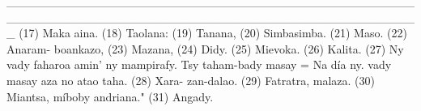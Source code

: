 _________________________________________________________________________________________________
(17) Maka aina. (18) Taolana: (19) Tanana, (20) Simbasimba. (21) Maso. (22) Anaram-
boankazo, (23) Mazana, (24) Didy. (25) Mievoka. (26) Kalita. (27) Ny vady faharoa amin' ny
mampirafy. Tsy taham-bady masay = Na día ny. vady masay aza no atao taha. (28) Xara-
zan-dalao. (29) Fatratra, malaza. (30) Miantsa, míboby andriana." (31) Angady.